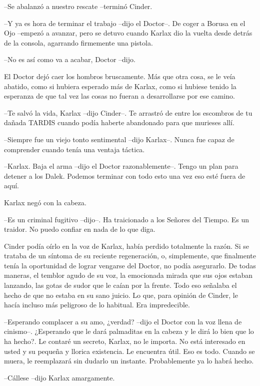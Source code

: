 --Se abalanzó a nuestro rescate --terminó Cinder.

--Y ya es hora de terminar el trabajo --dijo el Doctor--. De coger a Borusa en el Ojo --empezó a avanzar, pero se detuvo cuando Karlax dio la vuelta desde detrás de la consola, agarrando firmemente una pistola.

--No es así como va a acabar, Doctor --dijo.

El Doctor dejó caer los hombros bruscamente. Más que otra cosa, se le veía abatido, como si hubiera esperado más de Karlax, como si hubiese tenido la esperanza de que tal vez las cosas no fueran a desarrollarse por ese camino.

--Te salvó la vida, Karlax --dijo Cinder--. Te arrastró de entre los escombros de tu dañada TARDIS cuando podía haberte abandonado para que murieses allí.

--Siempre fue un viejo tonto sentimental --dijo Karlax--. Nunca fue capaz de comprender cuando tenía una ventaja táctica.

--Karlax. Baja el arma --dijo el Doctor razonablemente--. Tengo un plan para detener a los Dalek. Podemos terminar con todo esto una vez eso esté fuera de aquí.

Karlax negó con la cabeza. 

--Es un criminal fugitivo --dijo--. Ha traicionado a los Señores del Tiempo. Es un traidor. No puedo confiar en nada de lo que diga.

Cinder podía oírlo en la voz de Karlax, había perdido totalmente la razón. Si se trataba de un síntoma de su reciente regeneración, o, simplemente, que finalmente tenía la oportunidad de lograr vengarse del Doctor, no podía asegurarlo. De todas maneras, el temblor agudo de su voz, la emocionada mirada que sus ojos estaban lanzando, las gotas de sudor que le caían por la frente. Todo eso señalaba el hecho de que no estaba en su sano juicio. Lo que, para opinión de Cinder, le hacía incluso más peligroso de lo habitual. Era impredecible.

--Esperando complacer a su amo, ¿verdad? --dijo el Doctor con la voz llena de cinismo--. ¿Esperando que le dará palmaditas en la cabeza y le dirá lo bien que lo ha hecho?. Le contaré un secreto, Karlax, no le importa. No está interesado en usted y su pequeña y llorica existencia. Le encuentra útil. Eso es todo. Cuando se muera, le reemplazará sin dudarlo un instante. Probablemente ya lo habrá hecho.

--Cállese --dijo Karlax amargamente.

